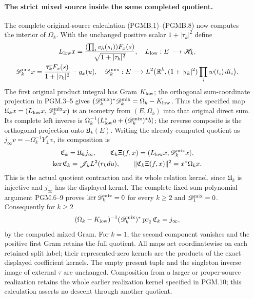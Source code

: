 \paragraph{The strict mixed source inside the same completed quotient.}
The complete original-source calculation (PGMB.1)--(PGMB.8)
now computes the interior of $\Omega_k$. With the unchanged
positive scalar $1+|\tau_k|^2$ define
\[
 \begin{gathered}
 L_{\rm low}x=
 \frac{(\prod_i v_h(s_i))F_x(s)}{\sqrt{1+|\tau_k|^2}},
 \quad L_{\rm low}:E\longrightarrow\mathscr H_k,\\
 \mathscr D_k^{\rm mix}x=
 \frac{\overline{\tau_k}F_x(s)}{1+|\tau_k|^2}-g_x(u),
 \quad \mathscr D_k^{\rm mix}:E\longrightarrow
 L^2\bigl(\mathbb R^k,(1+|\tau_k|^2)\prod_iw(t_i)\,dt_i\bigr).
 \end{gathered}
\]
The first original product integral has Gram $K_{\rm low}$;
the orthogonal sum-coordinate projection in PGM.3--5 gives
$(\mathscr D_k^{\rm mix})^*\mathscr D_k^{\rm mix}
=\Omega_k-K_{\rm low}$. Thus the specified map
$\mathfrak U_kx=(L_{\rm low}x,\mathscr D_k^{\rm mix}x)$
is an isometry from $(E,\Omega_k)$ into that original direct
sum. Its complete left inverse is
$\Omega_k^{-1}(L_{\rm low}^*a+
(\mathscr D_k^{\rm mix})^*b)$; the reverse composite is the
orthogonal projection onto $\mathfrak U_k(E)$.
Writing the already computed quotient as
$j_\infty v=-\Omega_k^{-1}Y_\perp^*v$, its composition is
\[
 \begin{gathered}
 \mathfrak C_k=\mathfrak U_kj_\infty,\qquad
 \mathfrak C_k\Xi(f,x)=(L_{\rm low}x,\mathscr D_k^{\rm mix}x),\\
 \ker\mathfrak C_k=\mathscr J_kL^2(r_kdu),\qquad
 \|\mathfrak C_k\Xi(f,x)\|^2=x^*\Omega_kx.
 \end{gathered}
\]
This is the actual quotient contraction and its whole relation
kernel, since $\mathfrak U_k$ is injective and $j_\infty$
has the displayed kernel. The complete fixed-sum polynomial
argument PGM.6--9 proves
$\ker\mathscr D_k^{\rm mix}=0$ for every $k\geq2$ and
$\mathscr D_1^{\rm mix}=0$. Consequently for $k\geq2$
\[
 (\Omega_k-K_{\rm low})^{-1}
 (\mathscr D_k^{\rm mix})^*\operatorname{pr}_2\mathfrak C_k
 =j_\infty,
\]
by the computed mixed Gram. For $k=1$, the second component
vanishes and the positive first Gram retains the full quotient.
All maps act coordinatewise on each retained split label;
their represented-zero kernels are the products of the exact
displayed coefficient kernels. The empty present tuple and
the singleton inverse image of external $\tau$ are unchanged.
Composition from a larger or proper-source realization retains
the whole earlier realization kernel specified in PGM.10;
this calculation asserts no descent through another quotient.

